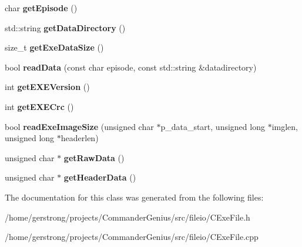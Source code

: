 \begin{DoxyCompactItemize}
\item 
\hypertarget{class_c_exe_file_a67cd5f95c9a7efbf10aa8aa24e4150d4}{
char {\bfseries getEpisode} ()}
\label{class_c_exe_file_a67cd5f95c9a7efbf10aa8aa24e4150d4}

\item 
\hypertarget{class_c_exe_file_a5d31b9cf12cfab00fe06be8bbd46bed8}{
std::string {\bfseries getDataDirectory} ()}
\label{class_c_exe_file_a5d31b9cf12cfab00fe06be8bbd46bed8}

\item 
\hypertarget{class_c_exe_file_ab72ac0f50a43d246fdbc55f67f3e8209}{
size\_\-t {\bfseries getExeDataSize} ()}
\label{class_c_exe_file_ab72ac0f50a43d246fdbc55f67f3e8209}

\item 
\hypertarget{class_c_exe_file_adc11ed9d2d327594ba85fc31063b8105}{
bool {\bfseries readData} (const char episode, const std::string \&datadirectory)}
\label{class_c_exe_file_adc11ed9d2d327594ba85fc31063b8105}

\item 
\hypertarget{class_c_exe_file_ad22f0dad9a41b75d8cbc707f8415f8ed}{
int {\bfseries getEXEVersion} ()}
\label{class_c_exe_file_ad22f0dad9a41b75d8cbc707f8415f8ed}

\item 
\hypertarget{class_c_exe_file_a78b0990bca663dcb89a4876ef6f8a725}{
int {\bfseries getEXECrc} ()}
\label{class_c_exe_file_a78b0990bca663dcb89a4876ef6f8a725}

\item 
\hypertarget{class_c_exe_file_a0258d8dc291fcaa7d74a7d94ed5fa25d}{
bool {\bfseries readExeImageSize} (unsigned char $\ast$p\_\-data\_\-start, unsigned long $\ast$imglen, unsigned long $\ast$headerlen)}
\label{class_c_exe_file_a0258d8dc291fcaa7d74a7d94ed5fa25d}

\item 
\hypertarget{class_c_exe_file_a0f1506acf88013a2112a168441655655}{
unsigned char $\ast$ {\bfseries getRawData} ()}
\label{class_c_exe_file_a0f1506acf88013a2112a168441655655}

\item 
\hypertarget{class_c_exe_file_a7daae4a637311d9f4bdd4ed59c65d413}{
unsigned char $\ast$ {\bfseries getHeaderData} ()}
\label{class_c_exe_file_a7daae4a637311d9f4bdd4ed59c65d413}

\end{DoxyCompactItemize}


The documentation for this class was generated from the following files:\begin{DoxyCompactItemize}
\item 
/home/gerstrong/projects/CommanderGenius/src/fileio/CExeFile.h\item 
/home/gerstrong/projects/CommanderGenius/src/fileio/CExeFile.cpp\end{DoxyCompactItemize}
